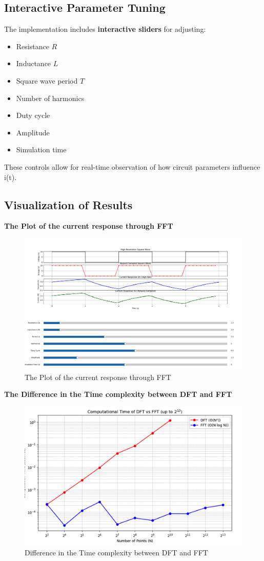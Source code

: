 \documentclass[journal]{IEEEtran}
\begin{document}
\subsection{Interactive Parameter Tuning}
The implementation includes \textbf{interactive sliders} for adjusting:
\begin{itemize}
    \item Resistance $R$
    \item Inductance $ L$
    \item Square wave period $T$
    \item Number of harmonics
    \item Duty cycle
    \item Amplitude
    \item Simulation time
\end{itemize}
These controls allow for real-time observation of how circuit parameters influence i(t).

\subsection{Visualization of Results}
\textbf{The Plot of the current response through FFT}
\begin{figure}[H]
    \centering
    \includegraphics[width=0.6\linewidth]{FFT_response/fft}
    \caption{The Plot of the current response through FFT}
    \label{fig:enter-label}
\end{figure}
\textbf{The Difference in the Time complexity between DFT and FFT }
\begin{figure}[H]
    \centering
    \includegraphics[width=0.6\linewidth]{FFT_response/compare}
    \caption{Difference in the Time complexity between DFT and FFT}
    \label{fig:enter-label}
\end{figure}
\end{document}
